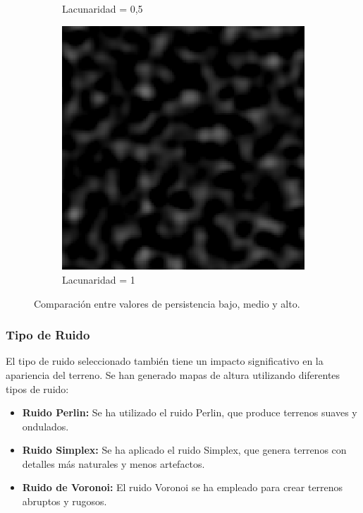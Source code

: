 \begin{figure}[ht]
\begin{subfigure}{0.3\linewidth}
        \caption{Lacunaridad = 0,5 }
    \end{subfigure}
    \hfill
    \begin{subfigure}{0.3\linewidth}
        \centering
        \includegraphics[width=\linewidth]{img/HeightPers.png}
        \caption{Lacunaridad = 1 }
    \end{subfigure}
    \caption{Comparación entre valores de persistencia bajo, medio y alto.}
\end{figure}


\subsubsection{Tipo de Ruido}

El tipo de ruido seleccionado también tiene un impacto significativo en la apariencia del terreno. Se han generado mapas de altura utilizando diferentes tipos de ruido:

\begin{itemize}
    \item \textbf{Ruido Perlin:} Se ha utilizado el ruido Perlin, que produce terrenos suaves y ondulados.
    \item \textbf{Ruido Simplex:} Se ha aplicado el ruido Simplex, que genera terrenos con detalles más naturales y menos artefactos.
    \item \textbf{Ruido de Voronoi:} El ruido Voronoi se ha empleado para crear terrenos abruptos y rugosos.
\end{itemize}

